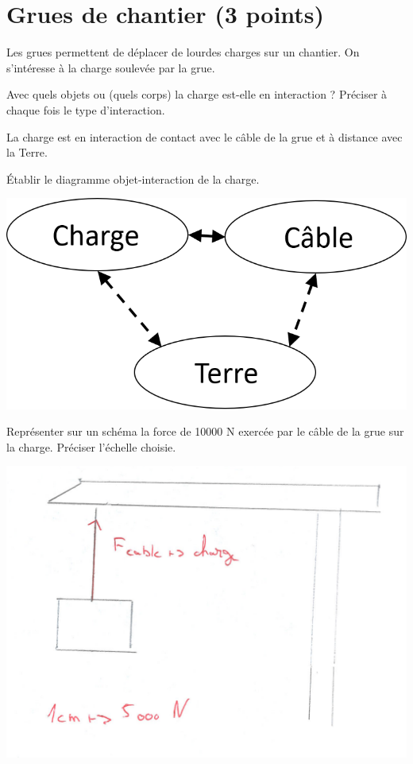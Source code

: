 \section{Grues de chantier (3 points)}\label{grues}

Les grues permettent de déplacer de lourdes charges sur un chantier. On s'intéresse à la charge soulevée par la grue.

\begin{questions}
	\question Avec quels objets ou (quels corps) la charge est-elle en interaction ? Préciser à chaque fois le type d'interaction.
		\begin{solution}
			La charge est en interaction de contact avec le câble de la grue et à distance avec la Terre.	
		\end{solution}
	
	\question \'Etablir le diagramme objet-interaction de la charge.
		\begin{solution}
			\begin{center}
				\includegraphics[scale=0.5]{doi_grue}
			\end{center}
		\end{solution}
	\question Représenter sur un schéma la force de \num{10000} N exercée par le câble de la grue sur la charge. Préciser l'échelle choisie.
	
	\begin{solution}
		\begin{center}
			\includegraphics[scale=0.35]{forces_grue2}
		\end{center}
	\end{solution}
\end{questions}